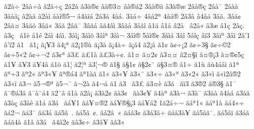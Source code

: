 {^^e22^^e0^^f7^^ad
2^^e2^^e0^^f7^^e2
^^e22^^e0^^f7^^e7
2^^e22^^e0^^ad
^^e23^^e0^^ae^^a2
^^e2^^e0^^ae3^^a4
^^e2^^e0^^ae^^e12
3^^e2^^e0^^ae^^e4
^^e23^^e0^^ae^^e6
2^^e2^^e0^^ae^^e7
2^^e2^^e0^^af
2^^e2^^e0^^e0
3^^e2^^e0^^e3^^a1
^^e22^^e0^^e3^^ad^^ad
^^e22^^e0^^ec
^^e2^^e0^^ec^^ae5^^ac
^^e24^^e0^^ef^^e1
2^^e23^^e1
4^^e2^^e1.
3^^e2^^e1^^f7
4^^e2^^e12^^aa
4^^e2^^e1^^ae
2^^e23^^e2
^^e24^^e2^^e1
3^^e2^^e3.
3^^e2^^e3^^a2
2^^e2^^e3^^a4
3^^e2^^e3^^f5
3^^e2^^e3^^ab
3^^e2^^e3^^ad
2^^e2^^e3^^af
3^^e2^^e3^^e1
^^e2^^e34^^e2^^ec
3^^e2^^e3^^e5
3^^e2^^e3^^ee
^^e21^^e4
^^e21^^e5
^^e22^^e5^^a0
^^e22^^e5^^ab
^^e23^^e6
^^e21^^e7
2^^e2^^e7.
^^e23^^e7^^a0
^^e21^^e8
^^e21^^e9
2^^e2^^ec
4^^e2^^ec.
3^^e2^^ec^^a1
3^^e2^^ec^^f5
3^^e2^^ec^^aa
3^^e2^^ec^^ac
3^^e2^^ec^^ae
5^^e2^^ec^^ae^^a2
3^^e2^^ec^^e1
3^^e2^^ee
5^^e2^^ee^^e7
^^e2^^ef3
3^^e2^^ef^^aa
3^^e2^^ef^^ad
2^^e2'1
^^e2'^^ef2
^^e31^^a0
^^e31^^a1
^^e3^^a1^^a53
^^e34^^a1^^aa
^^e32^^a11^^ae^^e0
^^e3^^a13^^e0
^^e3^^a14^^e0^^f7
^^e3^^a1^^e14
^^e32^^a1^^e2
^^e31^^a2
^^e3^^a2^^f7^^a12
^^e3^^a2^^f73^^a7
^^e3^^a2^^f7^^a92
^^e3^^a2^^f75^^ab2
^^e3^^a2^^f7^^ac2
^^e33^^a2^^aa
^^e33^^a3
^^e3^^a31^^e0
^^e3^^a33^^e0^^f7^^a2.
^^e31^^a4
^^e3^^a42^^a2
^^e33^^a4^^a4
^^e32^^a4^^a7^^ec
^^e3^^a4^^ae^^a13
^^e3^^a4^^ae^^a25^^e7
^^e31^^a5
^^e3^^a53^^ad
^^e3^^a54^^ad^^e2
^^e31^^f5
^^e31^^a6
^^e32^^a6^^aa
^^e33^^a6^^ac^^ae
^^e31^^a7
^^e3^^a71^^a2
^^e3^^a72^^a2^^a8
^^e3^^a73^^a4^^ae
^^e31^^f7
^^e31^^f9
^^e3^^f94^^e1^^e2^^ec
^^e31^^aa
^^e3^^aa^^f73^^ad
^^e3^^aa2^^ab
^^e3^^aa3^^ab^^a5
^^e3^^aa^^ae^^e14
^^e3^^aa1^^e0^^e3
^^e31^^ab
^^e33^^ab^^a5
^^e33^^ab^^a8
^^e33^^ab^^f7
^^e33^^ab^^aa
^^e33^^ab2^^ab
^^e33^^ab^^ec^^ad
^^e3^^ab^^ec2^^e2^^ae2
^^e33^^ab^^ef
^^e33^^ac
^^e35^^ac^^ae^^aa
^^e35^^ac^^af
^^e3^^ac2^^e0
^^e34^^ac^^e1
^^e31^^ad
^^e33^^ad^^a0
^^e33^^ad^^a3
^^e3^^ad3^^a4^^e8
^^e33^^ad^^e1^^a0
^^e3^^ad^^ef3
^^e33^^ae2
^^e3^^ae3^^a7
^^e31^^af
^^e3^^af^^ae^^e13^^e2
^^e3^^af^^e0^^a8^^e14
^^e32^^af^^e2
^^e31^^e0
^^e32^^e0^^a1
^^e33^^e02^^a2
^^e3^^e03^^a2^^a0
^^e3^^e03^^a2^^a5
^^e34^^e0^^aa
^^e33^^e0^^ac
^^e33^^e0^^af
^^e33^^e0^^e0
^^e34^^e0^^e1
^^e33^^e0^^e3
^^e33^^e0^^e7
^^e33^^e0^^e8
^^e31^^e1
^^e33^^e1^^a0
^^e3^^e1^^a51
^^e3^^e1^^a5^^a4^^ae2
^^e3^^e1^^a5^^ae^^a7^^a13
^^e3^^e1^^a5^^e12
1^^e32^^e1^^f7^^ac
^^e3^^e1^^aa1^^ab
^^e3^^e1^^aa1^^e0
^^e3^^e14^^ab^^f7
^^e3^^e12^^ac
^^e3^^e13^^af
^^e3^^e13^^e1
^^e3^^e15^^e2^^a0.
^^e3^^e15^^e2^^a0^^a2.
^^e3^^e12^^e2^^a0^^ab
^^e3^^e1^^e23^^a2
^^e33^^e13^^e2^^f7
^^e3^^e1^^e23^^e0^^a5
^^e3^^e15^^e2^^e3^^af.
^^e3^^e15^^e2^^ef
^^e33^^e1^^e3
^^e3^^e1^^e34^^e0
^^e31^^e2
^^e33^^e2^^a0
^^e34^^e22^^a2
^^e3^^e23^^a2^^f7
^^e33^^e2^^a5
^^e3^^e23^^ab
}
